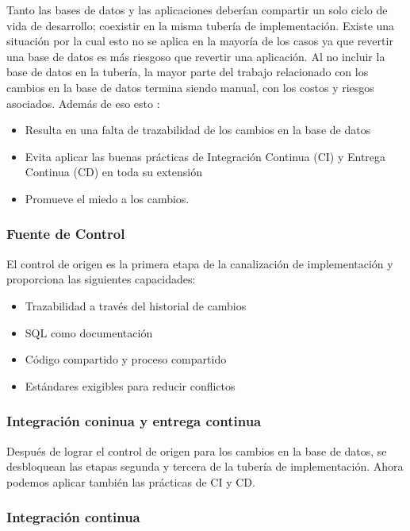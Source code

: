 \documentclass[preprint,12pt]{elsarticle}
\begin{document}
Tanto las bases de datos y las aplicaciones deberían compartir un solo ciclo de vida de desarrollo; coexistir en la misma tubería de implementación. Existe una situación por la cual esto no se aplica en la mayoría de los casos ya que revertir una base de datos es más riesgoso que revertir una aplicación. Al no incluir la base de datos en la tubería, la mayor parte del trabajo relacionado con los cambios en la base de datos termina siendo manual, con los costos y riesgos asociados. Además de eso esto :
\begin{itemize}

\item  Resulta en una falta de trazabilidad de los cambios en la base de datos
\item Evita aplicar las buenas prácticas de Integración Continua (CI) y Entrega Continua (CD) en toda su extensión
\item Promueve el miedo a los cambios.

\end{itemize}
\subsubsection{\textbf{Fuente de Control}}

El control de origen es la primera etapa de la canalización de implementación y proporciona las siguientes capacidades:
\begin{itemize}

\item Trazabilidad a través del historial de cambios
\item SQL como documentación
\item Código compartido y proceso compartido
\item Estándares exigibles para reducir conflictos

\end{itemize}

\subsubsection{\textbf{Integración coninua y entrega continua}}
Después de lograr el control de origen para los cambios en la base de datos, se desbloquean las etapas segunda y tercera de la tubería de implementación. Ahora podemos aplicar también las prácticas de CI y CD.


\subsubsection{\textbf{ Integración continua}}
\end{document}
